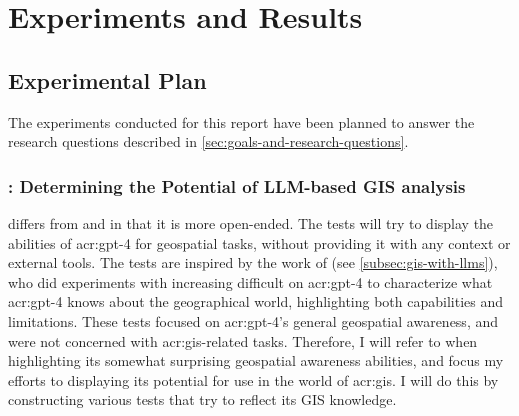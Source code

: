 \chapter{Experiments and Results}
\label{cha:experiments}

\section{Experimental Plan}
\label{sec:experimentalPlan}

\begin{comment}
Trying and failing is a major part of research. However, to have a chance of success you need a plan driving the experimental research, just as you need a plan for your literature search. Further, plans are made to be revised, and this revision ensures that any further decisions made are in line with the work already completed.

The plan should include what experiments or series of experiments are planned and what questions the individual or set of experiments aim to answer. Such questions should be connected to your research questions, so that in the evaluation of your results you can discuss the results wrt to the research questions.
\end{comment}

The experiments conducted for this report have been planned to answer the research questions described in \autoref{sec:goals-and-research-questions}.

\subsection[RQ1: Determining the Potential of LLM-based GIS analysis]{: Determining the Potential of LLM-based GIS analysis}

 differs from  and  in that it is more open-ended. The tests will try to display the abilities of \acrshort{acr:gpt}-4 for geospatial tasks, without providing it with any context or external tools. The tests are inspired by the work of \cite{robertsGPT4GEOHowLanguage2023} (see \autoref{subsec:gis-with-llms}), who did experiments with increasing difficult on \acrshort{acr:gpt}-4 to characterize what \acrshort{acr:gpt}-4 knows about the geographical world, highlighting both capabilities and limitations. These tests focused on \acrshort{acr:gpt}-4's general geospatial awareness, and were not concerned with \acrshort{acr:gis}-related tasks. Therefore, I will refer to \cite{robertsGPT4GEOHowLanguage2023} when highlighting its somewhat surprising geospatial awareness abilities, and focus my efforts to displaying its potential for use in the world of \acrshort{acr:gis}. I will do this by constructing various tests that try to reflect its GIS knowledge.


